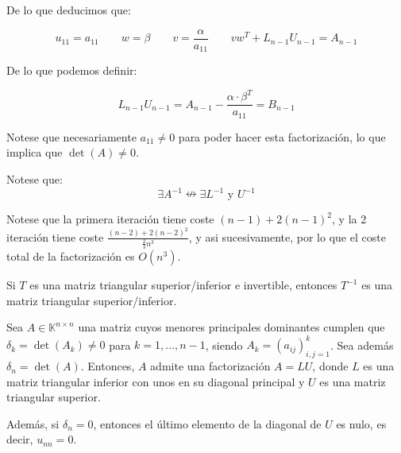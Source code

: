 De lo que deducimos que:

\[
    u_{11} = a_{11} \qquad w = \beta \qquad v = \frac{\alpha}{a_{11}} \qquad v w^T + L_{n-1} U_{n-1} = A_{n-1}
\]

De lo que podemos definir:

\[
    L_{n-1}U_{n-1} = A_{n-1} - \frac{\alpha \cdot \beta^T}{a_{11}} = B_{n-1}
\]

Notese que necesariamente $a_{11} \neq 0$ para poder hacer esta factorización, lo que implica que $\det(A) \neq 0$.\\

\begin{observación}
    Notese que:
    \[
        \exists A^{-1} \nleftrightarrow \exists L^{-1} \text{ y } U^{-1}
    \]
\end{observación}

Notese que la primera iteración tiene coste $(n-1) + 2(n-1)^2$, y la 2 iteración tiene coste $\frac{(n-2) + 2(n-2)^2}{\frac{2}{3}n^3}$, y asi sucesivamente, por lo que el coste total de la factorización es $O(n^3)$.\\

\begin{lema}
    Si $T$ es una matriz triangular superior/inferior e invertible, entonces $T^{-1}$ es una matriz triangular superior/inferior.
\end{lema}

\begin{teorema}
    Sea $A \in \mathbb{K}^{n \times n}$ una matriz cuyos menores principales dominantes cumplen que $\delta_k = \det(A_k) \neq 0$ para $k=1, \ldots, n-1$, siendo $A_k = (a_{ij})_{i,j=1}^k$. Sea además $\delta_n = \det(A)$. Entonces, $A$ admite una factorización $A = LU$, donde $L$ es una matriz triangular inferior con unos en su diagonal principal y $U$ es una matriz triangular superior.
    
    Además, si $\delta_n = 0$, entonces el último elemento de la diagonal de $U$ es nulo, es decir, $u_{nn} = 0$.
\end{teorema}

